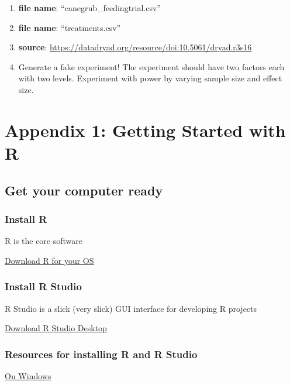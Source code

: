 \documentclass[]{book}
\theoremstyle{definition}
\theoremstyle{definition}
\theoremstyle{definition}
\theoremstyle{remark}
\begin{document}
\begin{enumerate}
\def\labelenumi{\arabic{enumi}.}
\item
  \textbf{file name}: ``canegrub\_feedingtrial.csv''
\item
  \textbf{file name}: ``treatments.csv''
\item
  \textbf{source}:
  \url{https://datadryad.org/resource/doi:10.5061/dryad.r3s16}
\item
  Generate a fake experiment! The experiment should have two factors
  each with two levels. Experiment with power by varying sample size and
  effect size.
\end{enumerate}

\chapter*{Appendix 1: Getting Started with
R}\label{appendix-1-getting-started-with-r}

\section{Get your computer ready}\label{get-your-computer-ready}

\subsection{Install R}\label{install-r}

R is the core software

\href{https://cran.r-project.org}{Download R for your OS}

\subsection{Install R Studio}\label{install-r-studio}

R Studio is a slick (very slick) GUI interface for developing R projects

\href{https://www.rstudio.com/products/rstudio/download/}{Download R
Studio Desktop}

\subsection{Resources for installing R and R
Studio}\label{resources-for-installing-r-and-r-studio}

\href{https://medium.com/@GalarnykMichael/install-r-and-rstudio-on-windows-5f503f708027}{On
Windows}
\end{document}

